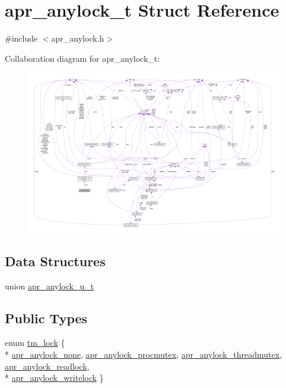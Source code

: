 \hypertarget{structapr__anylock__t}{}\section{apr\+\_\+anylock\+\_\+t Struct Reference}
\label{structapr__anylock__t}


{\ttfamily \#include $<$apr\+\_\+anylock.\+h$>$}



Collaboration diagram for apr\+\_\+anylock\+\_\+t\+:
\nopagebreak
\begin{figure}[H]
\begin{center}
\leavevmode
\includegraphics[width=350pt]{structapr__anylock__t__coll__graph}
\end{center}
\end{figure}
\subsection*{Data Structures}
\begin{DoxyCompactItemize}
\item 
union \hyperlink{unionapr__anylock__t_1_1apr__anylock__u__t}{apr\+\_\+anylock\+\_\+u\+\_\+t}
\end{DoxyCompactItemize}
\subsection*{Public Types}
\begin{DoxyCompactItemize}
\item 
enum \hyperlink{structapr__anylock__t_a047e5c4d930f359618a96fd5e857f851}{tm\+\_\+lock} \{ \\*
\hyperlink{structapr__anylock__t_a047e5c4d930f359618a96fd5e857f851aa538eef19ecc0576a84344a5191abbd8}{apr\+\_\+anylock\+\_\+none}, 
\hyperlink{structapr__anylock__t_a047e5c4d930f359618a96fd5e857f851a441c78d4b9f1ed5620a3f7f3195ca9d7}{apr\+\_\+anylock\+\_\+procmutex}, 
\hyperlink{structapr__anylock__t_a047e5c4d930f359618a96fd5e857f851ad68c4c27cf2b58cabca43d35890045b6}{apr\+\_\+anylock\+\_\+threadmutex}, 
\hyperlink{structapr__anylock__t_a047e5c4d930f359618a96fd5e857f851a764d57b3fda600d8b891bef6128d02b5}{apr\+\_\+anylock\+\_\+readlock}, 
\\*
\hyperlink{structapr__anylock__t_a047e5c4d930f359618a96fd5e857f851a865d43ac3a9bb62f942e4e85b0befbda}{apr\+\_\+anylock\+\_\+writelock}
 \}
\end{DoxyCompactItemize}
